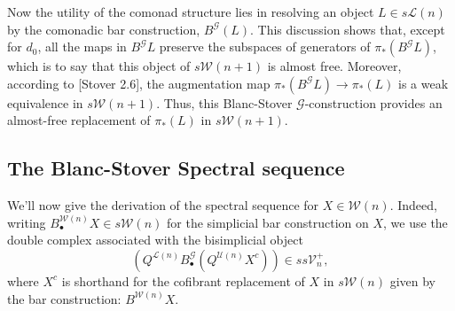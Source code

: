 \documentclass[11pt]{amsart}
\theoremstyle{plain}
\theoremstyle{definition}
\renewcommand{\to}{\longrightarrow}
\newcommand{\scrQ}{\mathscr{Q}}
\newcommand{\scrR}{\mathscr{R}}
\newcommand{\scrT}{\mathscr{T}}
\newcommand{\scrY}{\mathscr{Y}}
\newcommand{\scrI}{\mathscr{I}}
\newcommand{\scrO}{\mathscr{O}}
\newcommand{\scrP}{\mathscr{P}}
\newcommand{\scrS}{\mathscr{S}}
\newcommand{\scrG}{\mathscr{G}}
\newcommand{\scrH}{\mathscr{H}}
\newcommand{\scrJ}{\mathscr{J}}
\newcommand{\scrK}{\mathscr{K}}
\newcommand{\scrL}{\mathscr{L}}
\newcommand{\scrZ}{\mathscr{Z}}
\newcommand{\scrN}{\mathscr{N}}
\newcommand{\scrM}{\mathscr{M}}
\newcommand{\calW}{\mathcal{W}}
\newcommand{\calU}{\mathcal{U}}
\newcommand{\calL}{\mathcal{L}}
\newcommand{\calV}{\mathcal{V}}
\theoremstyle{plain}
\newcommand{\vect}[2]{\calV^{#1}_{#2}}
\newcommand{\BSW}{{\scrG}}%
\begin{document}
\begin{comp func sseq old version}
Now the utility of the comonad structure lies in resolving an object $L\in s\calL(n)$ by the comonadic bar construction, $B^\BSW(L)$. This discussion shows that, except for $d_0$, all the maps in $B^\BSW L$ preserve the subspaces of generators of $\pi_*(B^\BSW L)$, which is to say that this object of $s\calW(n+1)$ is almost free. Moreover, according to [Stover 2.6], the augmentation map $\pi_*(B^\BSW L)\to \pi_*(L)$ is a weak equivalence in $s\calW(n+1)$. Thus, this Blanc-Stover $\BSW $-construction provides an almost-free replacement of $\pi_*(L)$ in $s\calW(n+1)$.
%
%
%
%
%
%
%
%
%


\subsection{The Blanc-Stover Spectral sequence}
We'll now give the derivation of the spectral sequence for $X\in\calW(n)$. Indeed, writing $B^{\calW(n)}_{\bullet}X\in s\calW(n)$ for the simplicial bar construction on $X$, we use the double complex associated with the bisimplicial object
\[(Q^{\calL(n)}B^\BSW_{\bullet}(Q^{\calU(n)}X^c))\in ss\vect{+}{n},\]
where $X^c$ is shorthand for the cofibrant replacement of $X$ in $s\calW(n)$ given by the bar construction: $B^{\calW(n)}X$.










\end{comp func sseq old version}
\end{document}
